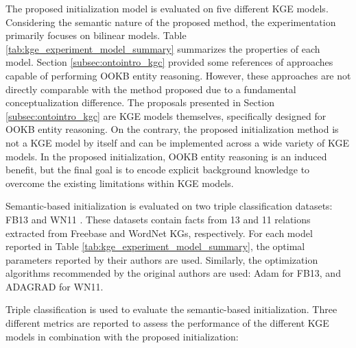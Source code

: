 The proposed initialization model is evaluated on five different KGE models. Considering the semantic nature of the proposed method, the experimentation primarily focuses on bilinear models. Table \ref{tab:kge_experiment_model_summary} summarizes the properties of each model. Section \ref{subsec:ontointro_kgc} provided some references of approaches capable of performing OOKB entity reasoning. However, these approaches are not directly comparable with the method proposed due to a fundamental conceptualization difference. The proposals presented in Section \ref{subsec:ontointro_kgc} are KGE models themselves, specifically designed for OOKB entity reasoning. On the contrary, the proposed initialization method is not a KGE model by itself and can be implemented across a wide variety of KGE models. In the proposed initialization, OOKB entity reasoning is an induced benefit, but the final goal is to encode explicit background knowledge to overcome the existing limitations within KGE models.

Semantic-based initialization is evaluated on two triple classification datasets: FB13 \citep{neuraltensornetwork,Bollacker:2008:FCC:1376616.1376746} and WN11 \citep{Miller95wordnet:a}. These datasets contain facts from 13 and 11 relations extracted from Freebase and WordNet KGs, respectively. For each model reported in Table \ref{tab:kge_experiment_model_summary}, the optimal parameters reported by their authors are used. Similarly, the optimization algorithms recommended by the original authors are used: Adam \cite{adam} for FB13, and ADAGRAD \cite{adagrad} for WN11.

Triple classification is used to evaluate  the semantic-based initialization. Three different metrics are reported to assess the performance of the different KGE models in combination with the proposed initialization:

